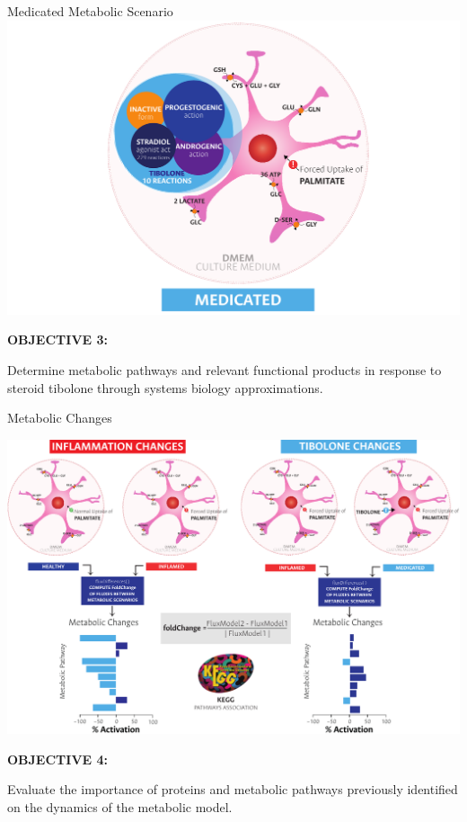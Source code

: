 \documentclass[11pt]{beamer}
\begin{document}
\begin{frame}{Medicated Metabolic Scenario}
\includegraphics[width=\textwidth]{Medicated}
\end{frame}
\begin{frame}
\begin{block}{\textbf{OBJECTIVE 3:}}
\begin{center}
Determine metabolic pathways and relevant functional products in response to steroid tibolone through systems biology approximations.\end{center}\end{block}
\end{frame}
\begin{frame}{Metabolic Changes}
\begin{center}
\includegraphics[width=\textwidth]{FluxDifferenes}
\end{center}
\end{frame}
\begin{frame}
\begin{block}{\textbf{OBJECTIVE 4:}}
\begin{center}
Evaluate the importance of proteins and metabolic pathways previously identified on the dynamics of the metabolic model.\end{center}\end{block}
\end{frame}
\end{document}
